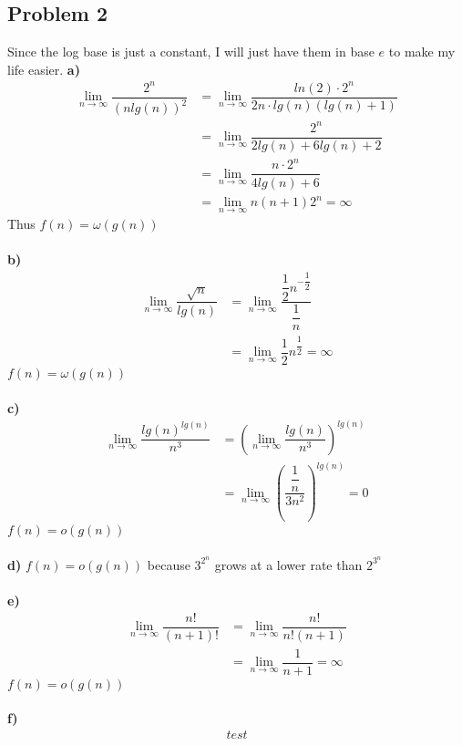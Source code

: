\documentclass[12pt]{article}
\begin{document}
\subsection*{Problem 2}
Since the log base is just a constant, I will just have them in base $e$ to make my life easier.
\textbf{a)} 
\begin{align*}
\lim_{n \rightarrow \infty} \dfrac{2^n}{(n lg(n))^2} &= \lim_{n \rightarrow \infty} \dfrac{ln(2) \cdot 2^n}{2n \cdot lg(n)(lg(n) + 1)}\\
&= \lim_{n \rightarrow \infty} \dfrac{2^n}{2lg(n)+6lg(n)+2}\\
&= \lim_{n \rightarrow \infty} \dfrac{n \cdot 2^n}{4lg(n)+6}\\
&= \lim_{n \rightarrow \infty} n(n+1)2^n = \infty
\end{align*}
Thus $f(n) = \omega(g(n))$\\\\
\textbf{b)}
\begin{align*}
\lim_{n \rightarrow \infty} \dfrac{\sqrt{n}}{lg(n)} &= \lim_{n \rightarrow \infty} \dfrac{\dfrac{1}{2}n^{-\dfrac{1}{2}}}{\dfrac{1}{n}}\\
&= \lim_{n \rightarrow \infty} \dfrac{1}{2}n^{\dfrac{1}{2}} = \infty
\end{align*}
$f(n) = \omega(g(n))$\\\\
\newpage
\textbf{c)}
\begin{align*}
\lim_{n \rightarrow \infty} \dfrac{lg(n)^{lg(n)}}{n^3} &= \left(  \lim_{n \rightarrow \infty} \dfrac{lg(n)}{n^3} \right)^{lg(n)}\\
&= \lim_{n \rightarrow \infty} \left( \dfrac{\dfrac{1}{n}}{3n^2} \right)^{lg(n)} = 0
\end{align*}
$f(n) = o(g(n))$\\\\
\textbf{d)}
$f(n) = o(g(n))$ because $3^{2^n}$ grows at a lower rate than $2^{3^n}$\\\\
\textbf{e)}
\begin{align*}
\lim_{n \rightarrow \infty} \dfrac{n!}{(n+1)!} &= \lim_{n \rightarrow \infty} \dfrac{n!}{n!(n+1)}\\
&= \lim_{n \rightarrow \infty} \dfrac{1}{n+1} = \infty
\end{align*}
$f(n) = o(g(n))$\\\\
\textbf{f)}
\begin{align*}
test
\end{align*}
\end{document}
